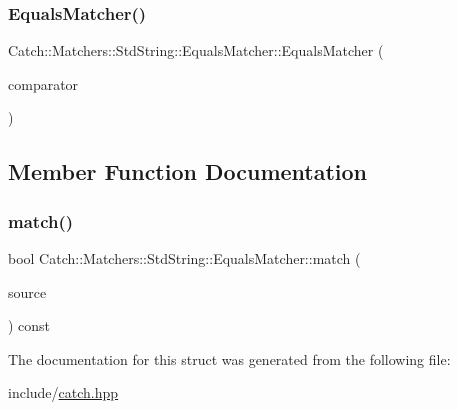 \subsubsection{\texorpdfstring{EqualsMatcher()}{EqualsMatcher()}}
{\footnotesize\ttfamily Catch\+::\+Matchers\+::\+Std\+String\+::\+Equals\+Matcher\+::\+Equals\+Matcher (\begin{DoxyParamCaption}\item[{\mbox{\hyperlink{struct_catch_1_1_matchers_1_1_std_string_1_1_cased_string}{Cased\+String}} const \&}]{comparator }\end{DoxyParamCaption})}



\subsection{Member Function Documentation}
\mbox{\label{struct_catch_1_1_matchers_1_1_std_string_1_1_equals_matcher_a0bb9d64693f7bb1ef7441062d219f21a}} 
\subsubsection{\texorpdfstring{match()}{match()}}
{\footnotesize\ttfamily bool Catch\+::\+Matchers\+::\+Std\+String\+::\+Equals\+Matcher\+::match (\begin{DoxyParamCaption}\item[{std\+::string const \&}]{source }\end{DoxyParamCaption}) const\hspace{0.3cm}{\ttfamily [override]}}



The documentation for this struct was generated from the following file\+:\begin{DoxyCompactItemize}
\item 
include/\mbox{\hyperlink{catch_8hpp}{catch.\+hpp}}\end{DoxyCompactItemize}
